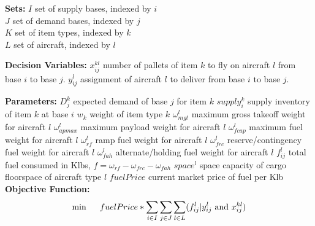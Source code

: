 \textbf{Sets:}\newline
$I$  set of supply bases, indexed by $i$\\
$J$  set of demand bases, indexed by $j$\\
$K$  set of item types, indexed by $k$\\
$L$  set of aircraft, indexed by $l$\newline

\textbf{Decision Variables:}  \newline
$x_{ij}^{kl}$  number of pallets of item $k$ to fly on aircraft $l$ from base $i$ to base $j$.  \newline
$y_{ij}^l$  assignment of aircraft $l$ to deliver from base $i$ to base $j$.  \newline

\textbf{Parameters:} \newline  
$D_j^{k}$  expected demand of base $j$ for item $k$   \newline 
$supply_i^k$  supply inventory of item $k$ at base $i$   \newline 
$w_{k}$  weight of item type $k$  \newline 
$\omega_{mgt}^{l}$ maximum gross takeoff weight for aircraft $l$   \newline
$\omega_{apmax}^l$ maximum payload weight for aircraft $l$ \newline
$\omega_{fcap}^l$ maximum fuel weight for aircraft $l$ \newline
$\omega_{rf}^l$ ramp fuel weight for aircraft $l$ \newline
$\omega_{frc}^l$ reserve/contingency fuel weight for aircraft $l$ \newline
$\omega_{fah}^l$ alternate/holding fuel weight for aircraft $l$ \newline
$f_{ij}^l$ total fuel consumed in Klbs, $f=\omega_{rf}-\omega_{frc}-\omega_{fah}$ \newline
$space^{l}$  space capacity of cargo floorspace of aircraft type $l$   \newline 
$fuelPrice$ current market price of fuel per Klb\\ 
\newpage
\textbf{Objective Function:}  
\begin{equation}
\label{eq_obj}
\min \hspace{5mm}
fuelPrice*\sum_{i\in I}\sum_{j\in J}\sum_{l\in L}(f_{ij}^l|y_{ij}^l \text{ and } x_{ij}^{kl}) 
\end{equation}

